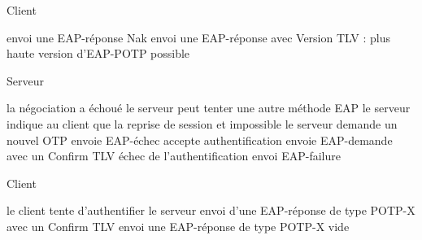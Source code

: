 \documentclass{article}
\begin{document}
\begin{flushright}
\begin{algorithm}
	\caption{Client}
	\label{TOTP:verif}
\begin{algorithmic}
	\STATE envoi une EAP-réponse Nak
\ELSE
	\STATE envoi une EAP-réponse avec Version TLV : plus haute version d'EAP-POTP possible
\ENDIF

\end{algorithmic}
\end{algorithm}
\end{flushright}

\begin{flushleft}
\begin{algorithm}
	\caption{Serveur}
	\label{TOTP:verif}
\begin{algorithmic}
	\STATE la négociation a échoué
	\STATE le serveur peut tenter une autre méthode EAP
\ENDIF
{}
	\STATE le serveur indique au client que la reprise de session et impossible
	\STATE le serveur demande un nouvel OTP
\ENDIF
{}
	\STATE envoie EAP-échec
\ENDIF
{}
	\STATE accepte authentification
	\STATE envoie EAP-demande avec un Confirm TLV
\ELSE
	\STATE échec de l'authentification
	\STATE envoi EAP-failure
\ENDIF


\end{algorithmic}
\end{algorithm}
\end{flushleft}


\begin{flushright}
\begin{algorithm}
	\caption{Client}
	\label{TOTP:verif}
\begin{algorithmic}
	\STATE le client tente d'authentifier le serveur
		\STATE envoi d'une EAP-réponse de type POTP-X avec un Confirm TLV
	\ELSE
		\STATE envoi une EAP-réponse de type POTP-X vide
	\ENDIF
\ENDIF

\end{algorithmic}
\end{algorithm}
\end{flushright}
\end{document}
